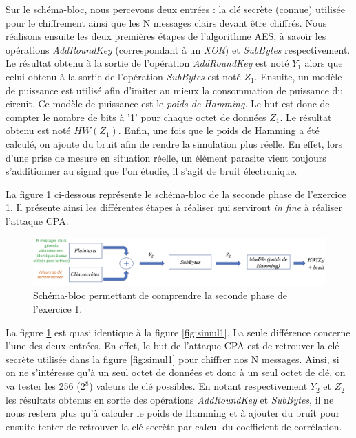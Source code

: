 \documentclass[oneside]{book}
\begin{document}
\vspace{-0.4 cm}Sur le schéma-bloc, nous percevons deux entrées : la clé secrète (connue) utilisée pour le chiffrement ainsi que les N messages clairs devant être chiffrés. Nous réalisons ensuite les deux premières étapes de l'algorithme AES, à savoir les opérations \textit{AddRoundKey} (correspondant à un \textit{XOR}) et \textit{SubBytes} respectivement. Le résultat obtenu à la sortie de l'opération \textit{AddRoundKey} est noté \textit{$Y_1$} alors que celui obtenu à la sortie de l'opération \textit{SubBytes} est noté \textit{$Z_1$}. Ensuite, un modèle de puissance est utilisé afin d'imiter au mieux la consommation de puissance du circuit. Ce modèle de puissance est le \textit{poids de Hamming}. Le but est donc de compter le nombre de bits à '1' pour chaque octet de données \textit{$Z_1$}. Le résultat obtenu est noté \textit{$HW(Z_1)$}. Enfin, une fois que le poids de Hamming a été calculé, on ajoute du bruit afin de rendre la simulation plus réelle. En effet, lors d'une prise de mesure en situation réelle, un élément parasite vient toujours s'additionner au signal que l'on étudie, il s'agit de bruit électronique.

La figure \ref{fig:simul2} ci-dessous représente le schéma-bloc de la seconde phase de l'exercice 1. Il présente ainsi les différentes étapes à réaliser qui serviront \textit{in fine} à réaliser l'attaque CPA.
\begin{figure}[htbp]
    \centering
    \includegraphics[scale=0.45]{image/simul2}
    \caption{Schéma-bloc permettant de comprendre la seconde phase de l'exercice 1.}
    \label{fig:simul2} 
\end{figure}

\vspace{-0.4 cm}La figure \ref{fig:simul2} est quasi identique à la figure \ref{fig:simul1}. La seule différence concerne l'une des deux entrées. En effet, le but de l'attaque CPA est de retrouver la clé secrète utilisée dans la figure \ref{fig:simul1} pour chiffrer nos N messages. Ainsi, si on ne s'intéresse qu'à un seul octet de données et donc à un seul octet de clé, on va tester les 256 ($2^8$) valeurs de clé possibles. En notant respectivement $Y_2$ et $Z_2$ les résultats obtenus en sortie des opérations \textit{AddRoundKey} et \textit{SubBytes}, il ne nous restera plus qu'à calculer le poids de Hamming et à ajouter du bruit pour ensuite tenter de retrouver la clé secrète par calcul du coefficient de corrélation.
\end{document}
